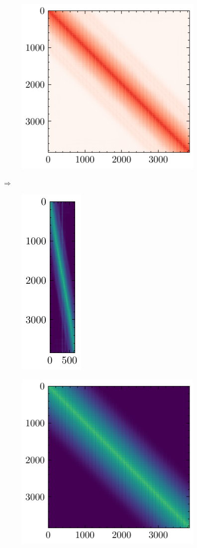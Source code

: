 \begin{figure}[h]
\centering
\begin{subfigure}{0.5\linewidth}
\centering
\includegraphics[scale=1.0]{densityO}
\end{subfigure}
$\Longrightarrow$
\begin{subfigure}{0.4\linewidth}
\centering
\includegraphics[scale=1.0]{choleskyO}
\end{subfigure}%
\hfill
\centering
\begin{subfigure}{0.5\linewidth}
\centering
\includegraphics[scale=1.0]{densityV}

\end{subfigure}
\end{figure}
